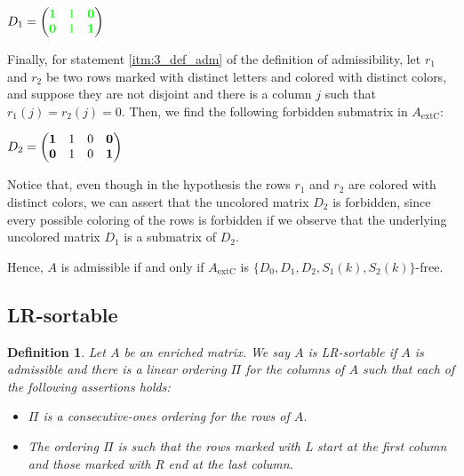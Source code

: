 \documentclass[a4paper,10pt]{report}
\theoremstyle{plain}
\theoremstyle{remark}
\theoremstyle{plain}
\newtheorem{defn}{Definition}[chapter]
\newcommand*{\extC}{\mathrm{extC}}
\begin{document}
\vspace{3mm}

$D_1 = \begin{pmatrix}
	\textcolor{green}{\textbf 1} & \textcolor{green}{1} & \textcolor{green}{\textbf 0} \\
	\textcolor{green}{\textbf 0} & \textcolor{green}{1} & \textcolor{green}{\textbf 1}
\end{pmatrix}$

\vspace{3mm}

Finally, for statement \ref{itm:3_def_adm} of the definition of admissibility, let $r_1$ and $r_2$ be two rows marked with distinct letters and colored with distinct colors, and suppose they are not disjoint and there is a column $j$ such that $r_1(j) = r_2(j) = 0$.
Then, we find the following forbidden submatrix in $A_{\extC}$:

\vspace{3mm}

$D_2  = \begin{pmatrix}
	\textbf 1 & 1 & 0 & \textbf 0 \\
	\textbf 0 & 1 & 0 & \textbf 1
\end{pmatrix}$

\vspace{3mm}

Notice that, even though in the hypothesis the rows $r_1$ and $r_2$ are colored with distinct colors, we can assert that the uncolored matrix $D_2$ is forbidden, since every possible coloring of the rows is forbidden if we observe that the underlying uncolored matrix $D_1$ is a submatrix of $D_2$.

\vspace{1mm}

Hence, $A$ is admissible if and only if $A_{\extC}$ is $\{ D_0, D_1, D_2, S_1(k), S_2(k) \}$-free.


\subsection{LR-sortable}

\begin{defn}
	Let $A$ be an enriched matrix. We say $A$ is \emph{LR-sortable} if $A$ is admissible and there is a linear ordering $\Pi$ for the columns of $A$ such that each of the following assertions holds:
	\begin{itemize}
	     \item $\Pi$ is a consecutive-ones ordering for the rows of $A$.
	
		\item The ordering $\Pi$ is such that the rows marked with L start at the first column and those marked with R end at the last column.		
     \end{itemize} 
\end{defn}
\end{document}
